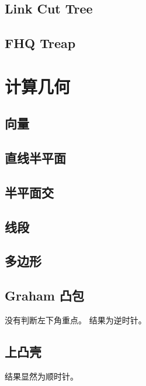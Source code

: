 \documentclass{article}
\begin{document}
\subsection{Link Cut Tree}

\newpage

\subsection{FHQ Treap} %

\newpage

\section{计算几何}
\subsection{向量}

\newpage

\subsection{直线半平面}

\newpage

\subsection{半平面交}

\newpage

\subsection{线段}

\newpage

\subsection{多边形}

\newpage

\subsection{Graham 凸包}
没有判断左下角重点。
结果为逆时针。


\newpage
\subsection{上凸壳}
结果显然为顺时针。

\newpage
\end{document}
